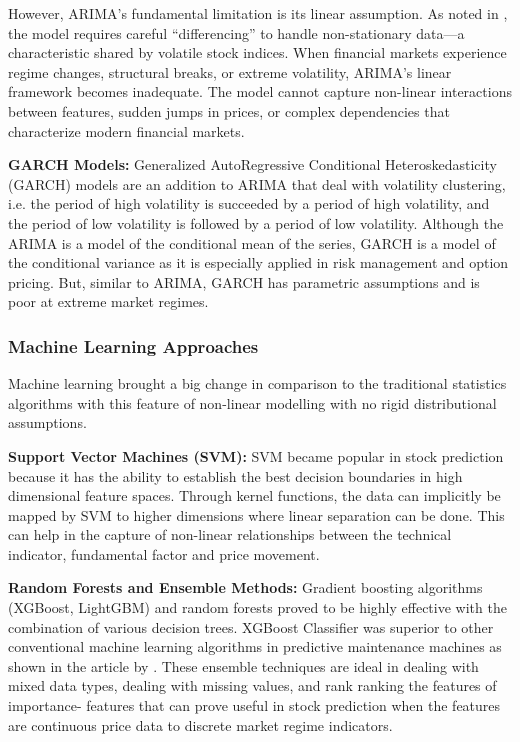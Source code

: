 However, ARIMA's fundamental limitation is its linear assumption. As noted in \cite{supermarket2025}, the model requires careful ``differencing'' to handle non-stationary data---a characteristic shared by volatile stock indices. When financial markets experience regime changes, structural breaks, or extreme volatility, ARIMA's linear framework becomes inadequate. The model cannot capture non-linear interactions between features, sudden jumps in prices, or complex dependencies that characterize modern financial markets.

\textbf{GARCH Models:}
Generalized AutoRegressive Conditional Heteroskedasticity (GARCH) models are an addition to ARIMA that deal with volatility clustering, i.e. the period of high volatility is succeeded by a period of high volatility, and the period of low volatility is followed by a period of low volatility. Although the ARIMA is a model of the conditional mean of the series, GARCH is a model of the conditional variance as it is especially applied in risk management and option pricing. But, similar to ARIMA, GARCH has parametric assumptions and is poor at extreme market regimes.

\subsubsection{Machine Learning Approaches}

Machine learning brought a big change in comparison to the traditional statistics algorithms with this feature of non-linear modelling with no rigid distributional assumptions.

\textbf{Support Vector Machines (SVM):}
SVM became popular in stock prediction because it has the ability to establish the best decision boundaries in high dimensional feature spaces. Through kernel functions, the data can implicitly be mapped by SVM to higher dimensions where linear separation can be done. This can help in the capture of non-linear relationships between the technical indicator, fundamental factor and price movement.

\textbf{Random Forests and Ensemble Methods:}
Gradient boosting algorithms (XGBoost, LightGBM) and random forests proved to be highly effective with the combination of various decision trees. XGBoost Classifier was superior to other conventional machine learning algorithms in predictive maintenance machines as shown in the article by \cite{machinefailure2024}. These ensemble techniques are ideal in dealing with mixed data types, dealing with missing values, and rank ranking the features of importance- features that can prove useful in stock prediction when the features are continuous price data to discrete market regime indicators.

